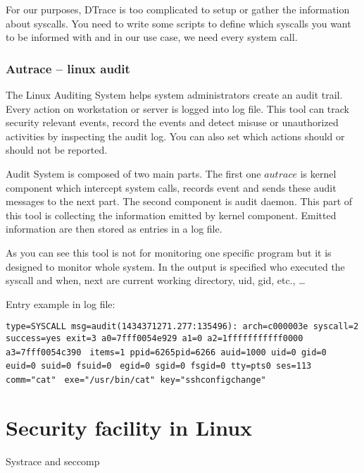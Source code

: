 For our purposes, DTrace is too complicated to setup or gather the information about syscalls.
You need to write some scripts to define which syscalls you want to be informed with and in our use case, we need every system call.

\subsection{Autrace -- linux audit}
The Linux Auditing System helps system administrators create an audit trail.
Every action on workstation or server is logged into log file.
This tool can track security relevant events, record the events and detect misuse or unauthorized activities by inspecting the audit log.
You can also set which actions should or should not be reported. 

Audit System is composed of two main parts.
The first one \(autrace\) is kernel component which intercept system calls, records event and sends these audit messages to the next part.
The second component is audit daemon.
This part of this tool is collecting the information emitted by kernel component.
Emitted information are then stored as entries in a log file.

As you can see this tool is not for monitoring one specific program but it is designed to monitor whole system.
In the output is specified who executed the syscall and when, next are current working directory, uid, gid, etc., \ldots

Entry example in log file:

\noindent
\texttt{type=SYSCALL msg=audit(1434371271.277:135496): arch=c000003e syscall=2}\linebreak
\texttt{success=yes exit=3 a0=7fff0054e929 a1=0 a2=1fffffffffff0000 a3=7fff0054c390 }\linebreak
\texttt{items=1 ppid=6265pid=6266 auid=1000 uid=0 gid=0 euid=0 suid=0 fsuid=0 }\linebreak
\texttt{egid=0 sgid=0 fsgid=0 tty=pts0 ses=113 comm="cat" }\linebreak
\texttt{exe="/usr/bin/cat" key="sshconfigchange"}



\chapter{Security facility in Linux}
Systrace\cite{systrace_web} and seccomp\cite{seccomp_sandbox}

